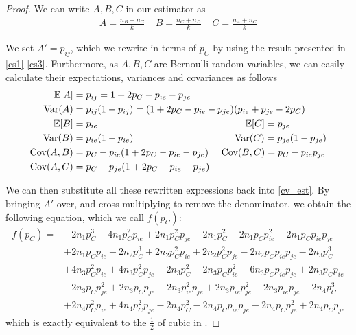 \documentclass[runningheads]{llncs}
\newcommand{\var}{\text{Var}}
\newcommand{\cov}{\text{Cov}}
\newcommand{\e}{\mathbb{E}}
\begin{document}
\begin{proof}
We can write $A, B, C$ in our estimator as
\begin{align}
A = \frac{n_B + n_C}{k} ~~~~~ B = \frac{n_C + n_D}{k} ~~~~~ C = \frac{n_A + n_C}{k}
\end{align}
            
We set $A' = p_{ij}$, which we rewrite in terms of $p_C$ by using the result presented in \eqref{cs1}-\eqref{cs3}. Furthermore, as $A, B, C$ are Bernoulli random variables, we can easily calculate their expectations, variances and covariances as follows
\begin{align}
\e[A] &= p_{ij} = 1 + 2p_C - p_{ie} - p_{je} \\
\var(A) & = p_{ij} (1 - p_{ij}) = (1 + 2p_C - p_{ie} - p_{je})(p_{ie} + p_{je} - 2p_C)\\  
\e[B] &= p_{ie} \hspace{5.4cm} \e[C] = p_{je} \\
\var(B) &= p_{ie} (1 - p_{ie}) \hspace{3.7cm}\var(C) = p_{je} (1 - p_{je}) \\
                \cov(A, B) &= p_C - p_{ie}(1 + 2p_C - p_{ie} - p_{je})~~~~\cov(B, C) = p_C - p_{ie}p_{je} \\
                \cov(A, C) &= p_C - p_{je}(1 + 2p_C - p_{ie} - p_{je})            
            \end{align}
            
            We can then substitute all these rewritten expressions back into \eqref{cv_est}. By bringing $A'$ over, and cross-multiplying to remove the denominator, we obtain the following equation, which we call $f(p_C)$:
\begin{equation}\label{cvb_fin}
\begin{split}
f(p_C) ={} &- 2 n_{1} p_C^{3} + 4 n_{1} p_C^{2} p_{ie} + 2 n_{1} p_C^{2} p_{je} - 2 n_{1} p_C^{2} - 2 n_{1} p_C p_{ie}^{2} - 2 n_{1} p_C p_{ie} p_{je} \\
 &+ 2 n_{1} p_C p_{ie} - 2 n_{2} p_C^{3} + 2 n_{2} p_C^{2} p_{ie} + 2 n_{2} p_C^{2} p_{je} - 2 n_{2} p_C p_{ie} p_{je} - 2 n_{3} p_C^{3} \\
 &+ 4 n_{3} p_C^{2} p_{ie} + 4 n_{3} p_C^{2} p_{je} - 2 n_{3} p_C^{2} - 2 n_{3} p_C p_{ie}^{2} - 6 n_{3} p_C p_{ie} p_{je} + 2 n_{3} p_C p_{ie} \\
&- 2 n_{3} p_C p_{je}^{2} + 2 n_{3} p_C p_{je} + 2 n_{3} p_{ie}^{2} p_{je} + 2 n_{3} p_{ie} p_{je}^{2} - 2 n_{3} p_{ie} p_{je} - 2 n_{4} p_C^{3} \\
&+ 2 n_{4} p_C^{2} p_{ie} + 4 n_{4} p_C^{2} p_{je} - 2 n_{4} p_C^{2} - 2 n_{4} p_C p_{ie} p_{je} - 2 n_{4} p_C p_{je}^{2} + 2 n_{4} p_C p_{je}
                \end{split}
            \end{equation}
which is exactly equivalent to the $\frac{1}{2}$ of cubic in \cite{kang2018improving}.       
\end{proof}
\end{document}
